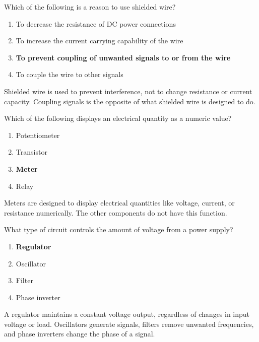 \begin{tcolorbox}[colback=gray!10!white,colframe=black!75!black,title={T6D03}]
Which of the following is a reason to use shielded wire?
\begin{enumerate}[label=\Alph*),noitemsep]
    \item To decrease the resistance of DC power connections
    \item To increase the current carrying capability of the wire
    \item \textbf{To prevent coupling of unwanted signals to or from the wire}
    \item To couple the wire to other signals
\end{enumerate}
\end{tcolorbox}
Shielded wire is used to prevent interference, not to change resistance or current capacity. Coupling signals is the opposite of what shielded wire is designed to do.

\begin{tcolorbox}[colback=gray!10!white,colframe=black!75!black,title={T6D04}]
Which of the following displays an electrical quantity as a numeric value?
\begin{enumerate}[label=\Alph*),noitemsep]
    \item Potentiometer
    \item Transistor
    \item \textbf{Meter}
    \item Relay
\end{enumerate}
\end{tcolorbox}
Meters are designed to display electrical quantities like voltage, current, or resistance numerically. The other components do not have this function.

\begin{tcolorbox}[colback=gray!10!white,colframe=black!75!black,title={T6D05}]
What type of circuit controls the amount of voltage from a power supply?
\begin{enumerate}[label=\Alph*),noitemsep]
    \item \textbf{Regulator}
    \item Oscillator
    \item Filter
    \item Phase inverter
\end{enumerate}
\end{tcolorbox}
A regulator maintains a constant voltage output, regardless of changes in input voltage or load. Oscillators generate signals, filters remove unwanted frequencies, and phase inverters change the phase of a signal.

